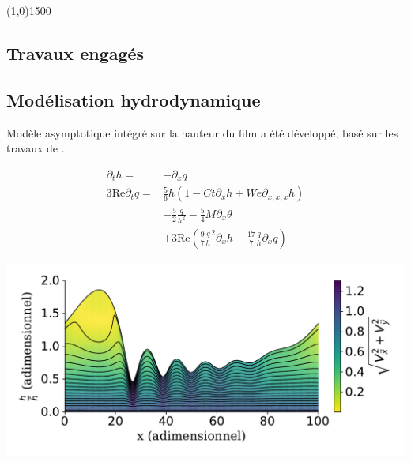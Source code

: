 \documentclass[a0,portrait]{a0poster}
\begin{document}
\begin{center}
    \line(1,0){1500}
\end{center}

\begin{multicols}{2}

    \section*{Travaux engagés}
    \subsection*{Modélisation hydrodynamique}
    Modèle asymptotique intégré sur la hauteur du film a été développé, basé sur les travaux de \textcite{Ruyer-Quil2000}.

    \begin{multicols}{2}
        \begin{align*}
            \partial_t h =& -\partial_x q\\
            3 \mathrm{Re} \partial_t q =& \frac{5}{6} h
                \left(
                    1 - Ct \partial_x h + We \partial_{x,x,x} h
                \right)\\
            & - \frac{5}{2}\frac{q}{h^2}
            - \frac{5}{4} M \partial_x \theta \\
            & + 3 \mathrm{Re}
                \left(
                    \frac{9}{7}\frac{q}{h}^2 \partial_x h - \frac{17}{7}\frac{q}{h} \partial_x q
                \right)
        \end{align*}
        \columnbreak
        \begin{center}\vspace{.5cm}
            \includegraphics[width=0.95\columnwidth]{01-established_wave_streamlines}
            \label{fig:streamlines}
        \end{center}\vspace{.5cm}
    \end{multicols}


\end{multicols}
\end{document}
